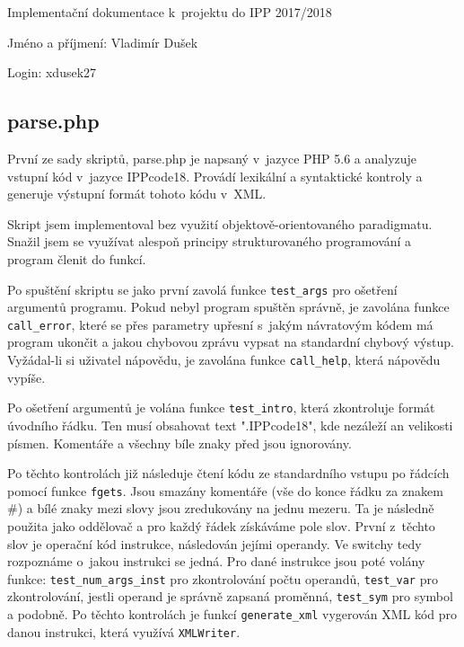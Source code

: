 \documentclass[10pt, a4paper]{article}
\begin{document}
\begin{center}

	{\Large Implementační dokumentace k~projektu do IPP 2017/2018}
	\medskip

	{\Large Jméno a příjmení: Vladimír Dušek}
	\medskip

	{\Large Login: xdusek27}

\end{center}

\subsection*{parse.php}
	První ze sady skriptů, parse.php je napsaný v~jazyce PHP 5.6 a analyzuje vstupní kód v~jazyce IPPcode18. Provádí lexikální a syntaktické kontroly a generuje výstupní formát tohoto kódu v~XML.

	Skript jsem implementoval bez využití objektově-orientovaného paradigmatu. Snažil jsem se využívat alespoň principy strukturovaného programování a program členit do funkcí.

	Po spuštění skriptu se jako první zavolá funkce \texttt{test\_args} pro ošetření argumentů programu. Pokud nebyl program spuštěn správně, je zavolána funkce \texttt{call\_error}, které se přes parametry upřesní s~jakým návratovým kódem má program ukončit a jakou chybovou zprávu vypsat na standardní chybový výstup. Vyžádal-li si uživatel nápovědu, je zavolána funkce \texttt{call\_help}, která nápovědu vypíše.

	Po ošetření argumentů je volána funkce \texttt{test\_intro}, která zkontroluje formát úvodního řádku. Ten musí obsahovat text ".IPPcode18", kde nezáleží an velikosti písmen. Komentáře a všechny bíle znaky před jsou ignorovány.

	Po těchto kontrolách již následuje čtení kódu ze standardního vstupu po řádcích pomocí funkce \texttt{fgets}. Jsou smazány komentáře (vše do konce řádku za znakem \#) a bílé znaky mezi slovy jsou zredukovány na jednu mezeru. Ta je následně použita jako oddělovač a pro každý řádek získáváme pole slov. První z~těchto slov je operační kód instrukce, následován jejími operandy. Ve switchy tedy rozpoznáme o~jakou instrukci se jedná. Pro dané instrukce jsou poté volány funkce: \texttt{test\_num\_args\_inst} pro zkontrolování počtu operandů, \texttt{test\_var} pro zkontrolování, jestli operand je správně zapsaná proměnná, \texttt{test\_sym} pro symbol a podobně. Po těchto kontrolách je funkcí \texttt{generate\_xml} vygerován XML kód pro danou instrukci, která využívá \texttt{XMLWriter}.
\end{document}
